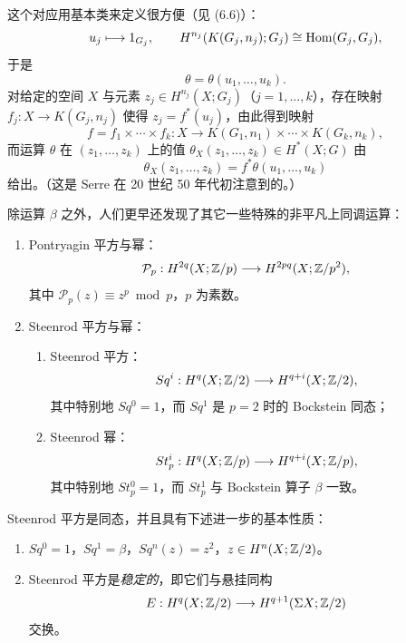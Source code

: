 这个对应用基本类来定义很方便（见 (6.6)）：
\[
u_j\longmapsto 1_{G_j},\qquad H^{n_j}(K(G_j,n_j);G_j)\cong\operatorname{Hom}(G_j,G_j),
\]
于是
\begin{equation}
\theta=\theta(u_1,\dots,u_k). \tag{6.8}
\end{equation}
对给定的空间 $X$ 与元素 $z_j\in H^{n_j}(X;G_j)$（$j=1,\dots,k$），存在映射 $f_j:X\to K(G_j,n_j)$ 使得 $z_j=f^*(u_j)$，由此得到映射
\[
f=f_1\times\cdots\times f_k:X\longrightarrow K(G_1,n_1)\times\cdots\times K(G_k,n_k),
\]
而运算 $\theta$ 在 $(z_1,\dots,z_k)$ 上的值 $\theta_X(z_1,\dots,z_k)\in H^*(X;G)$ 由
\[
\theta_X(z_1,\dots,z_k)=f^*\theta(u_1,\dots,u_k)
\]
给出。（这是 Serre 在 20 世纪 50 年代初注意到的。）

除运算 $\beta$ 之外，人们更早还发现了其它一些特殊的非平凡上同调运算：

\begin{enumerate}[label=\arabic*),leftmargin=2em]
\item Pontryagin 平方与幂：
\[
\mathcal{P}_p:H^{2q}(X;\mathbb{Z}/p)\longrightarrow H^{2pq}(X;\mathbb{Z}/p^2),
\]
其中 $\mathcal{P}_p(z)\equiv z^p\bmod p$，$p$ 为素数。
\item Steenrod 平方与幂：
\begin{enumerate}[label=\alph*),leftmargin=1.8em]
\item Steenrod 平方：
\[
Sq^i:H^q(X;\mathbb{Z}/2)\longrightarrow H^{q+i}(X;\mathbb{Z}/2),
\]
其中特别地 $Sq^0=1$，而 $Sq^1$ 是 $p=2$ 时的 Bockstein 同态；
\item Steenrod 幂：
\[
St^i_p:H^q(X;\mathbb{Z}/p)\longrightarrow H^{q+i}(X;\mathbb{Z}/p),
\]
其中特别地 $St^0_p=1$，而 $St^1_p$ 与 Bockstein 算子 $\beta$ 一致。
\end{enumerate}
\end{enumerate}

Steenrod 平方是同态，并且具有下述进一步的基本性质：
\begin{enumerate}[label=(\roman*),leftmargin=2.2em]
\item $Sq^0=1$，$Sq^1=\beta$，$Sq^n(z)=z^2$，$z\in H^n(X;\mathbb{Z}/2)$。
\item Steenrod 平方是\emph{稳定的}，即它们与悬挂同构
\[
E:H^q(X;\mathbb{Z}/2)\longrightarrow H^{q+1}(\Sigma X;\mathbb{Z}/2)
\]
交换。
\end{enumerate}
